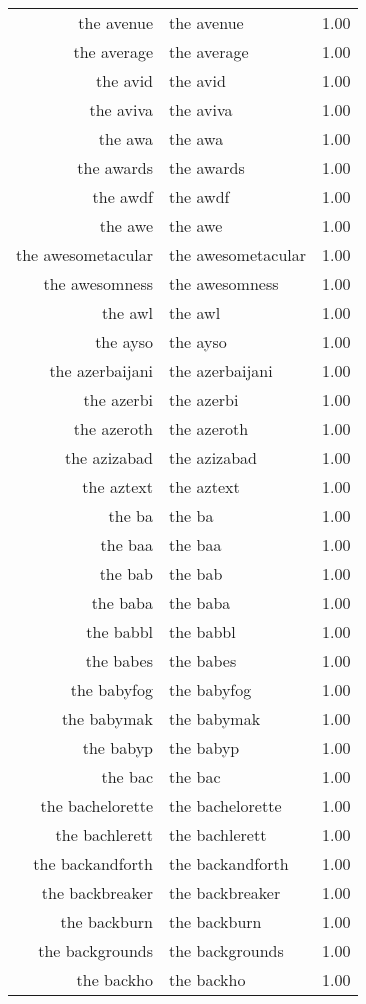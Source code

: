 \begin{table}[ht]
\begin{tabular}{rlr}
  the avenue & the avenue & 1.00 \\ 
  the average & the average & 1.00 \\ 
  the avid & the avid & 1.00 \\ 
  the aviva & the aviva & 1.00 \\ 
  the awa & the awa & 1.00 \\ 
  the awards & the awards & 1.00 \\ 
  the awdf & the awdf & 1.00 \\ 
  the awe & the awe & 1.00 \\ 
  the awesometacular & the awesometacular & 1.00 \\ 
  the awesomness & the awesomness & 1.00 \\ 
  the awl & the awl & 1.00 \\ 
  the ayso & the ayso & 1.00 \\ 
  the azerbaijani & the azerbaijani & 1.00 \\ 
  the azerbi & the azerbi & 1.00 \\ 
  the azeroth & the azeroth & 1.00 \\ 
  the azizabad & the azizabad & 1.00 \\ 
  the aztext & the aztext & 1.00 \\ 
  the ba & the ba & 1.00 \\ 
  the baa & the baa & 1.00 \\ 
  the bab & the bab & 1.00 \\ 
  the baba & the baba & 1.00 \\ 
  the babbl & the babbl & 1.00 \\ 
  the babes & the babes & 1.00 \\ 
  the babyfog & the babyfog & 1.00 \\ 
  the babymak & the babymak & 1.00 \\ 
  the babyp & the babyp & 1.00 \\ 
  the bac & the bac & 1.00 \\ 
  the bachelorette & the bachelorette & 1.00 \\ 
  the bachlerett & the bachlerett & 1.00 \\ 
  the backandforth & the backandforth & 1.00 \\ 
  the backbreaker & the backbreaker & 1.00 \\ 
  the backburn & the backburn & 1.00 \\ 
  the backgrounds & the backgrounds & 1.00 \\ 
  the backho & the backho & 1.00 \\ 

\end{tabular}
\end{table}
